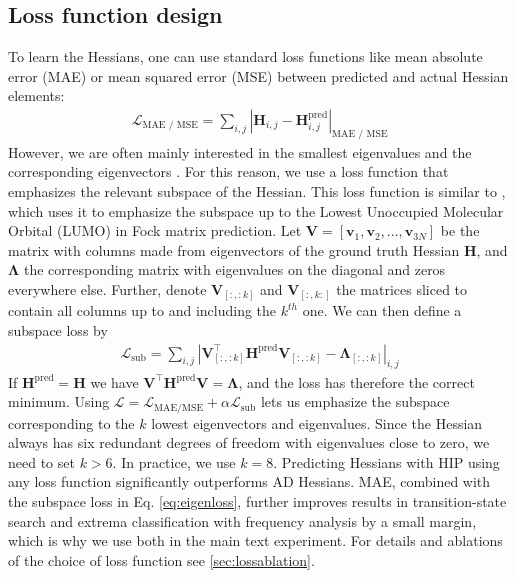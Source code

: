 \documentclass[pdflatex,sn-mathphys-num]{sn-jnl}%
\theoremstyle{thmstyleone}%
\theoremstyle{thmstyletwo}%
\theoremstyle{thmstylethree}%
\begin{document}
\subsection{Loss function design}
To learn the Hessians, one can use standard loss functions like mean absolute error (MAE) or mean squared error (MSE) between predicted and actual Hessian elements:
\begin{align}
    \mathcal{L}_\text{MAE / MSE} = \sum_{i,j} |\mathbf{H}_{i,j} - \mathbf{H}^\text{pred}_{i,j}|_\text{MAE / MSE}
\end{align}
However, we are often mainly interested in the smallest eigenvalues and the corresponding eigenvectors \citep{RSRFO1998a, cerjanFindingTransitionStates1981}. 
For this reason, we use a loss function that emphasizes the relevant subspace of the Hessian. This loss function is similar to \cite{li2025enhancing}, which uses it to emphasize the subspace up to the Lowest Unoccupied Molecular Orbital (LUMO) in Fock matrix prediction.
Let $\mathbf{V} = [\mathbf{v}_1,\mathbf{v}_2,...,\mathbf{v}_{3N}]$ be the matrix with columns made from eigenvectors of the ground truth Hessian $\mathbf{H}$, and $\mathbf{\Lambda}$ the corresponding matrix with eigenvalues on the diagonal and zeros everywhere else. Further, denote $\mathbf{V}_{[:,:k]}$ and $\mathbf{V}_{[:,k:]}$ the matrices sliced to contain all columns up to and including the $k^{th}$ one. We can then define a subspace loss by
\begin{align}
    \mathcal{L}_\text{sub} = \sum_{i,j} \left|\mathbf{V}_{[:,:k]}^\top \mathbf{H}^\text{pred}\mathbf{V}_{[:,:k]} - \mathbf{\Lambda}_{[:,:k]}\right|_{i,j} 
    \label{eq:eigenloss}
\end{align}
If $\mathbf{H}^\text{pred} = \mathbf{H}$ we have $\mathbf{V}^\top \mathbf{H}^\text{pred}\mathbf{V} = \mathbf{\Lambda}$, and the loss has therefore the correct minimum. Using $\mathcal{L}=\mathcal{L}_\text{MAE/MSE}+\alpha\mathcal{L}_\text{sub}$ lets us emphasize the subspace corresponding to the $k$ lowest eigenvectors and eigenvalues. Since the Hessian always has six redundant degrees of freedom with eigenvalues close to zero, we need to set $k>6$. In practice, we use $k=8$.
% 
Predicting Hessians with HIP using any loss function significantly outperforms AD Hessians. MAE, combined with the subspace loss in Eq. \eqref{eq:eigenloss}, further improves results in transition-state search and extrema classification with frequency analysis by a small margin, which is why we use both in the main text experiment. 
For details and ablations of the choice of loss function see \ref{sec:lossablation}. 
\end{document}
